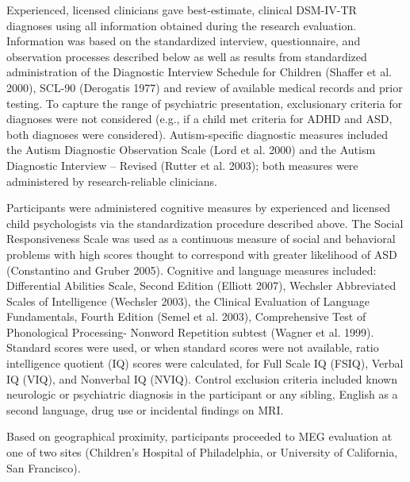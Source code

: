 \documentclass{article}
\begin{document}
Experienced, licensed clinicians gave best-estimate, clinical DSM-IV-TR diagnoses using all information obtained during the research evaluation. Information was based on the standardized interview, questionnaire, and observation processes described below as well as results from standardized administration of the Diagnostic Interview Schedule for Children (Shaffer et al. 2000), SCL-90 (Derogatis 1977) and review of available medical records and prior testing. To capture the range of psychiatric presentation, exclusionary criteria for diagnoses were not considered (e.g., if a child met criteria for ADHD and ASD, both diagnoses were considered). Autism-specific diagnostic measures included the Autism Diagnostic Observation Scale (Lord et al. 2000) and the Autism Diagnostic Interview – Revised (Rutter et al. 2003); both measures were administered by research-reliable clinicians.  

\medskip

Participants were administered cognitive measures by experienced and licensed child psychologists via the standardization procedure described above.  The Social Responsiveness Scale was used as a continuous measure of social and behavioral problems with high scores thought to correspond with greater likelihood of ASD (Constantino and Gruber 2005).  Cognitive and language measures included: Differential Abilities Scale, Second Edition (Elliott 2007), Wechsler Abbreviated Scales of Intelligence (Wechsler 2003), the Clinical Evaluation of Language Fundamentals, Fourth Edition (Semel et al. 2003), Comprehensive Test of Phonological Processing- Nonword Repetition subtest (Wagner et al. 1999). Standard scores were used, or when standard scores were not available, ratio intelligence quotient (IQ) scores were calculated, for Full Scale IQ (FSIQ), Verbal IQ (VIQ), and Nonverbal IQ (NVIQ). Control exclusion criteria included known neurologic or psychiatric diagnosis in the participant or any sibling, English as a second language, drug use or incidental findings on MRI.  
\medskip

Based on geographical proximity, participants proceeded to MEG evaluation at one of two sites (Children’s Hospital of Philadelphia, or University of California, San Francisco).  
\medskip
\end{document}
